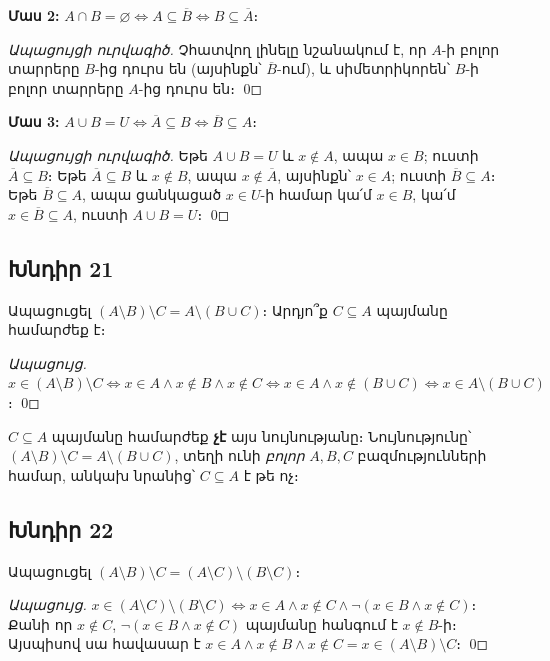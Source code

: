 \textbf{Մաս 2:} $A \cap B = \varnothing \iff A \subseteq \overline{B} \iff B \subseteq \overline{A}$։

\textit{Ապացույցի ուրվագիծ.} Չհատվող լինելը նշանակում է, որ $A$-ի բոլոր տարրերը $B$-ից դուրս են (այսինքն՝ $\overline{B}$-ում), և սիմետրիկորեն՝ $B$-ի բոլոր տարրերը $A$-ից դուրս են։ \qed

\textbf{Մաս 3:} $A \cup B = U \iff \overline{A} \subseteq B \iff \overline{B} \subseteq A$։

\textit{Ապացույցի ուրվագիծ.} Եթե $A \cup B = U$ և $x \notin A$, ապա $x \in B$; ուստի $\overline{A} \subseteq B$։ Եթե $\overline{A} \subseteq B$ և $x \notin B$, ապա $x \notin \overline{A}$, այսինքն՝ $x \in A$; ուստի $\overline{B} \subseteq A$։ Եթե $\overline{B} \subseteq A$, ապա ցանկացած $x \in U$-ի համար կա՛մ $x \in B$, կա՛մ $x \in \overline{B} \subseteq A$, ուստի $A \cup B = U$։ \qed

\subsection*{Խնդիր 21}
Ապացուցել $(A \setminus B) \setminus C = A \setminus (B \cup C)$։ Արդյո՞ք $C \subseteq A$ պայմանը համարժեք է։

\textit{Ապացույց.} $x \in (A \setminus B) \setminus C \iff x \in A \land x \notin B \land x \notin C \iff x \in A \land x \notin (B \cup C) \iff x \in A \setminus (B \cup C)$։ \qed

$C \subseteq A$ պայմանը համարժեք \textbf{չէ} այս նույնությանը։ Նույնությունը՝ $(A \setminus B) \setminus C = A \setminus (B \cup C)$, տեղի ունի \emph{բոլոր} $A, B, C$ բազմությունների համար, անկախ նրանից՝ $C \subseteq A$ է թե ոչ։

\subsection*{Խնդիր 22}
Ապացուցել $(A \setminus B) \setminus C = (A \setminus C) \setminus (B \setminus C)$։

\textit{Ապացույց.}
$x \in (A \setminus C) \setminus (B \setminus C) \iff x \in A \land x \notin C \land \lnot(x \in B \land x \notin C)$։
Քանի որ $x \notin C$, $\lnot(x \in B \land x \notin C)$ պայմանը հանգում է $x \notin B$-ի։
Այսպիսով սա հավասար է $x \in A \land x \notin B \land x \notin C = x \in (A \setminus B) \setminus C$։ \qed

